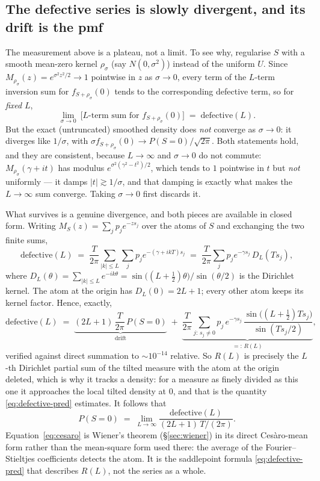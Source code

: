 \documentclass[11pt]{article}
\begin{document}
\subsection{The defective series is slowly divergent, and its drift is the pmf}
\label{sec:defective-drift}

The measurement above is a plateau, not a limit. To see why, regularise $S$ with a smooth mean-zero
kernel $\rho_\sigma$ (say $N(0,\sigma^2)$) instead of the uniform $U$. Since
$M_{\rho_\sigma}(z)=e^{\sigma^2z^2/2}\to1$ pointwise in $z$ as $\sigma\to0$, every term of the
$L$-term inversion sum for $f_{S+\rho_\sigma}(0)$ tends to the corresponding defective term, so for
\emph{fixed} $L$,
\[
  \lim_{\sigma\to0}\ \Big[\text{$L$-term sum for } f_{S+\rho_\sigma}(0)\Big]\;=\;\text{defective}(L).
\]
But the exact (untruncated) smoothed density does \emph{not} converge as $\sigma\to0$: it diverges
like $1/\sigma$, with $\sigma f_{S+\rho_\sigma}(0)\to P(S=0)/\sqrt{2\pi}$. Both statements hold, and
they are consistent, because $L\to\infty$ and $\sigma\to0$ do not commute: $M_{\rho_\sigma}(\gamma+it)$
has modulus $e^{\sigma^2(\gamma^2-t^2)/2}$, which tends to $1$ pointwise in $t$ but \emph{not}
uniformly — it damps $|t|\gtrsim1/\sigma$, and that damping is exactly what makes the $L\to\infty$
sum converge. Taking $\sigma\to0$ first discards it.

What survives is a genuine divergence, and both pieces are available in closed form. Writing
$M_S(z)=\sum_j p_j e^{-zs_j}$ over the atoms of $S$ and exchanging the two finite sums,
\[
  \text{defective}(L)
  \;=\;\frac{T}{2\pi}\sum_{|k|\le L}\sum_j p_j e^{-(\gamma+ikT)s_j}
  \;=\;\frac{T}{2\pi}\sum_j p_j e^{-\gamma s_j}\,D_L(Ts_j),
\]
where $D_L(\theta)=\sum_{|k|\le L}e^{-ik\theta}=\sin\!\big((L+\tfrac12)\theta\big)/\sin(\theta/2)$ is
the Dirichlet kernel. The atom at the origin has $D_L(0)=2L+1$; every other atom keeps its kernel
factor. Hence, exactly,
\begin{equation}
  \label{eq:defect-drift}
  \text{defective}(L)\;=\;\underbrace{(2L+1)\,\frac{T}{2\pi}\,P(S=0)}_{\text{drift}}
  \;+\;\underbrace{\frac{T}{2\pi}\sum_{j:\,s_j\ne0} p_j\,e^{-\gamma s_j}\,
      \frac{\sin\!\big((L+\tfrac12)Ts_j\big)}{\sin(Ts_j/2)}}_{=:\,R(L)},
\end{equation}
verified against direct summation to $\sim\!10^{-14}$ relative. So $R(L)$ is precisely the $L$-th
Dirichlet partial sum of the tilted measure with the atom at the origin deleted, which is why it
tracks a density: for a measure as finely divided as this one it approaches the local tilted density
at $0$, and that is the quantity \eqref{eq:defective-pred} estimates. It follows that
\begin{equation}
  \label{eq:cesaro}
  P(S=0)\;=\;\lim_{L\to\infty}\frac{\text{defective}(L)}{(2L+1)\,T/(2\pi)} .
\end{equation}
Equation~\eqref{eq:cesaro} is Wiener's theorem (\S\ref{sec:wiener}) in its direct Ces\`aro-mean form
rather than the mean-square form used there: the average of the Fourier--Stieltjes coefficients
detects the atom. It is the saddlepoint formula \eqref{eq:defective-pred} that describes $R(L)$, not
the series as a whole.
\end{document}
